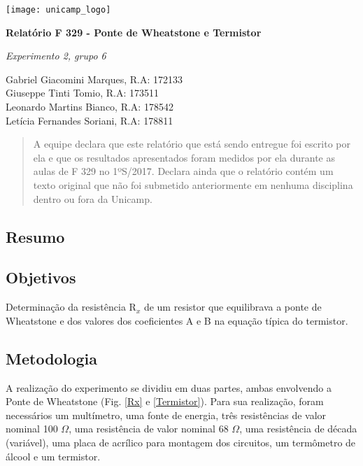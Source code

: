 \documentclass[12pt]{article}
\begin{document}
    \hfill \texttt{[image: unicamp\_logo]} %
    
    \begin{center}
        \textbf{\Large
            Relatório F 329 - Ponte de Wheatstone e Termistor
        }%
        
        \textit{Experimento 2, grupo 6}
    
        Gabriel Giacomini Marques, R.A: 172133 \\
        Giuseppe Tinti Tomio, R.A: 173511 \\
        Leonardo Martins Bianco, R.A: 178542 \\
        Letícia Fernandes Soriani, R.A: 178811
    \end{center}
    
    
    \def\abstractname{Afirmação de Honestidade} %
    \begin{abstract}
        A equipe declara que este relatório que está sendo entregue foi escrito por ela e que os resultados apresentados foram medidos por ela durante as aulas de F 329 no 1ºS/2017. Declara ainda que o relatório contém um texto original que não foi submetido anteriormente em nenhuma disciplina dentro ou fora da Unicamp.
    \end{abstract}

    
    \subsection*{Resumo}
        
    
    \subsection*{Objetivos}
       
    Determinação da resistência R$_x$ de um resistor que equilibrava a ponte de Wheatstone e dos valores dos coeficientes A e B na equação típica do termistor.
    
    \subsection*{Metodologia}    
    
    A realização do experimento se dividiu em duas partes, ambas envolvendo a Ponte de Wheatstone (Fig. \ref{Rx} e \ref{Termistor}). Para sua realização, foram necessários um multímetro, uma fonte de energia, três resistências de valor nominal 100 $\Omega$, uma resistência de valor nominal 68 $\Omega$, uma resistência de década (variável), uma placa de acrílico para montagem dos circuitos, um termômetro de álcool e um termistor.
    
\end{document}
